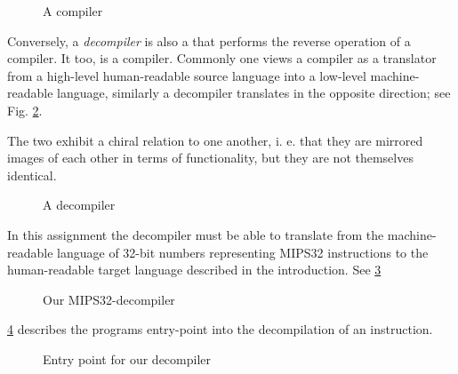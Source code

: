 \begin{figure}[H]
  \centering
  
  \caption{A compiler}
  \label{fig:compiler}
\end{figure}

Conversely, a \emph{decompiler} is also a that performs the reverse
operation of a compiler. It too, is a compiler. Commonly one views a
compiler as a translator from a high-level human-readable source
language into a low-level machine-readable language, similarly a
decompiler translates in the opposite direction; see
Fig. \ref{fig:decompiler}. 

The two exhibit a chiral relation to one another, i. e. that they are
mirrored images of each other in terms of functionality, but they are
not themselves identical.

\begin{figure}[H]
  \centering
  
  \caption{A decompiler}
  \label{fig:decompiler}
\end{figure}

In this assignment the decompiler must be able to translate from the
machine-readable language of 32-bit numbers representing MIPS32
instructions to the human-readable target language described in the
introduction. See \ref{fig:mipsdecompiler}

\begin{figure}[H]
  \centering
  
  \caption{Our MIPS32-decompiler}
  \label{fig:mipsdecompiler}
\end{figure}

\ref{fig:entrypointdecompiler} describes the programs entry-point into the
decompilation of an instruction.

\begin{figure}[H]
  \centering
  
  \caption{Entry point for our decompiler}
  \label{fig:entrypointdecompiler}
\end{figure}

